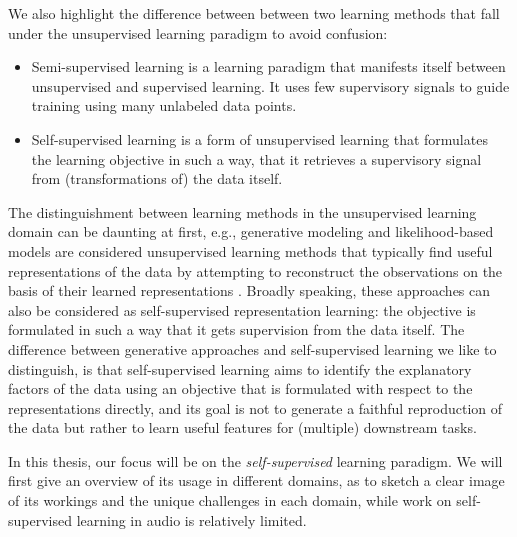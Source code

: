 We also highlight the difference between between two learning methods that fall under the unsupervised learning paradigm to avoid confusion:
\begin{itemize}
    \item Semi-supervised learning is a learning paradigm that manifests itself between unsupervised and supervised learning. It uses few supervisory signals to guide training using many unlabeled data points. 
    \item Self-supervised learning is a form of unsupervised learning that formulates the learning objective in such a way, that it retrieves a supervisory signal from (transformations of) the data itself.
\end{itemize}


The distinguishment between learning methods in the unsupervised learning domain can be daunting at first, e.g., generative modeling and likelihood-based models are considered unsupervised learning methods that typically find useful representations of the data by attempting to reconstruct the observations on the basis of their learned representations \cite{goodfellow2014generative, unsupervised_gan}.
Broadly speaking, these approaches can also be considered as self-supervised representation learning: the objective is formulated in such a way that it gets supervision from the data itself.
The difference between generative approaches and self-supervised learning we like to distinguish, is that self-supervised learning aims to identify the explanatory factors of the data using an objective that is formulated with respect to the representations directly, and its goal is not to generate a faithful reproduction of the data but rather to learn useful features for (multiple) downstream tasks.

In this thesis, our focus will be on the \textit{self-supervised} learning paradigm. We will first give an overview of its usage in different domains, as to sketch a clear image of its workings and the unique challenges in each domain, while work on self-supervised learning in audio is relatively limited.

